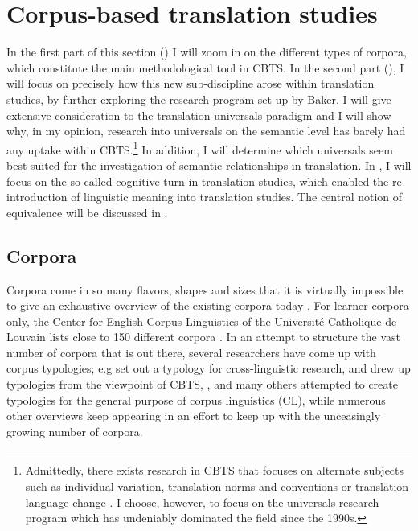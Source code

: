 \section{Corpus-based translation studies}
\label{sec:2.2}
In the first part of this section () I will zoom in on the different types of corpora, which constitute the main methodological tool in CBTS. In the second part (), I will focus on precisely how this new sub-discipline arose within translation studies, by further exploring the research program set up by Baker. I will give extensive consideration to the translation universals paradigm and I will show why, in my opinion, research into universals on the semantic level has barely had any uptake within CBTS.\footnote{Admittedly, there exists research in CBTS that focuses on alternate subjects such as individual variation, translation norms and conventions or translation language change \citep[21]{zanettin_corpus_2013}. I choose, however, to focus on the universals research program which has undeniably dominated the field since the 1990s.} In addition, I will determine which universals seem best suited for the investigation of semantic relationships in translation. In , I will focus on the so-called cognitive turn in translation studies, which enabled the re-introduction of linguistic meaning into translation studies. The central notion of equivalence will be discussed in .\hypertarget{Corpora}{}

\subsection{Corpora}
\label{sec:2.2.1}  
Corpora come in so many flavors, shapes and sizes that it is virtually impossible to give an exhaustive overview of the existing corpora today \citep{mcenery_corpus_2012}. For learner corpora only, the Center for English Corpus Linguistics of the Université Catholique de Louvain lists close to 150 different corpora \citep{hiligsmann_learner_2015}. In an attempt to structure the vast number of corpora that is out there, several researchers have come up with corpus typologies; e.g \citet{johansson_role_1998} set out a typology for cross-linguistic research, \citet{baker_corpora_1995} and \citet{laviosa_corpus-based_2002} drew up typologies from the viewpoint of CBTS, \citet{brown_corpora_2006}, \citet{mccarthy_what_2010} and many others attempted to create typologies for the general purpose of corpus linguistics (CL), while numerous other overviews keep appearing in an effort to keep up with the unceasingly growing number of corpora.

